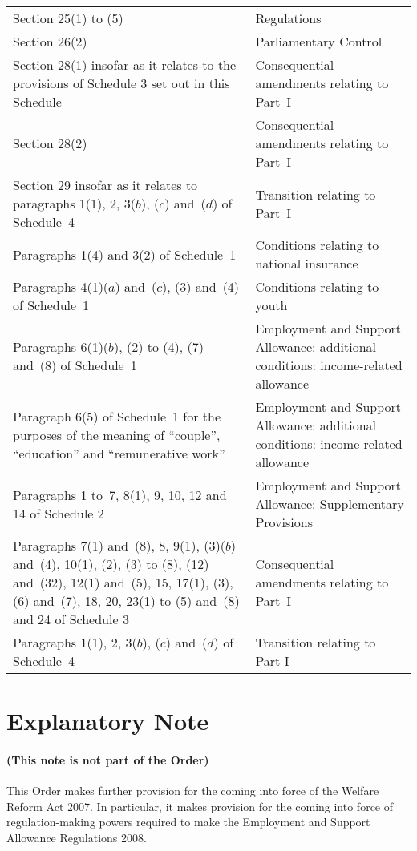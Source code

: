\documentclass[12pt,a4paper]{article}
\begin{document}
\begin{longtable}{p{236.03096pt}p{129.95471pt}}
Section 25(1) to (5)	&Regulations\\
Section 26(2)	&Parliamentary Control\\
Section 28(1) insofar as it relates to the provisions of Schedule 3 set out in this Schedule	&Consequential amendments relating to Part~I\\
Section 28(2)	&Consequential amendments relating to Part~I\\
Section 29 insofar as it relates to paragraphs 1(1), 2, 3($b$), ($c$)  and~($d$)  of Schedule~4	&Transition relating to Part~I\\
Paragraphs 1(4) and 3(2) of Schedule~1	&Conditions relating to national insurance\\
Paragraphs 4(1)($a$)  and~($c$), (3) and~(4) of Schedule~1	&Conditions relating to youth\\
Paragraphs 6(1)($b$), (2) to (4), (7) and~(8) of Schedule~1	&Employment and Support Allowance: additional conditions: income-related allowance\\
Paragraph 6(5) of Schedule~1 for the purposes of the meaning of “couple”, “education” and “remunerative work”	&Employment and Support Allowance: additional conditions: income-related allowance\\
Paragraphs 1 to~7, 8(1), 9, 10, 12 and 14 of Schedule 2	&Employment and Support Allowance: Supplementary Provisions\\
Paragraphs 7(1) and~(8), 8, 9(1), (3)($b$)  and~(4), 10(1), (2), (3) to (8), (12) and~(32), 12(1) and~(5), 15, 17(1), (3), (6) and~(7), 18, 20, 23(1) to (5) and~(8) and 24 of Schedule 3	&Consequential amendments relating to Part~I\\
Paragraphs 1(1), 2, 3($b$), ($c$)  and~($d$)  of Schedule~4	&Transition relating to Part I\\
\end{longtable}

\part{Explanatory Note}

\renewcommand\parthead{— Explanatory Note}

\subsection*{(This note is not part of the Order)}

This Order makes further provision for the coming into force of the Welfare Reform Act 2007. In particular, it makes provision for the coming into force of regulation-making powers required to make the Employment and Support Allowance Regulations 2008.
\end{document}
